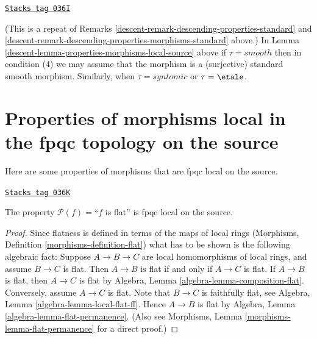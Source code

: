 \begin{remark}
\label{descent-remark-properties-morphisms-local-source-standard}
\href{https://stacks.math.columbia.edu/tag/036I}{\texttt{Stacks tag 036I}}

(This is a repeat of
Remarks \ref{descent-remark-descending-properties-standard}
and \ref{descent-remark-descending-properties-morphisms-standard} above.)
In Lemma \ref{descent-lemma-properties-morphisms-local-source} above if
$\tau = smooth$ then in condition (4) we may assume that
the morphism is a (surjective) standard smooth morphism.
Similarly, when $\tau = syntomic$ or $\tau = \etale$.
\end{remark}

\section{Properties of morphisms local in the fpqc topology on the source}
\label{descent-section-fpqc-local-source}
Here are some properties of morphisms that are fpqc local on the source.

\begin{lemma}
\label{descent-lemma-flat-fpqc-local-source}
\href{https://stacks.math.columbia.edu/tag/036K}{\texttt{Stacks tag 036K}}

The property $\mathcal{P}(f)=$``$f$ is flat'' is fpqc local on the source.
\end{lemma}

\begin{proof}
Since flatness is defined in terms of the maps of local rings
(Morphisms, Definition \ref{morphisms-definition-flat})
what has to be shown is the following
algebraic fact: Suppose $A \to B \to C$ are local homomorphisms of local
rings, and assume $B \to C$ is flat. Then $A \to B$ is
flat if and only if $A \to C$ is flat.
If $A \to B$ is flat, then $A \to C$ is flat by
Algebra, Lemma \ref{algebra-lemma-composition-flat}.
Conversely, assume $A \to C$ is flat.
Note that $B \to C$ is faithfully
flat, see
Algebra, Lemma \ref{algebra-lemma-local-flat-ff}.
Hence $A \to B$ is flat by
Algebra, Lemma \ref{algebra-lemma-flat-permanence}.
(Also see Morphisms, Lemma \ref{morphisms-lemma-flat-permanence}
for a direct proof.)
\end{proof}

